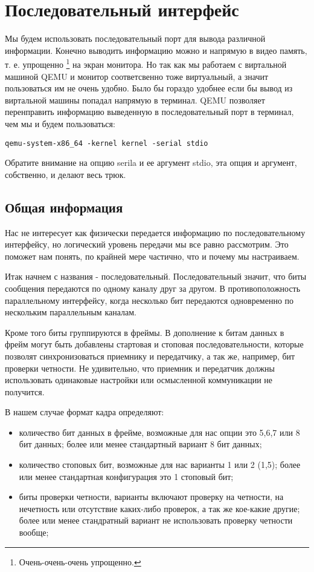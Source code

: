 \section{Последовательный интерфейс}

Мы будем использовать последовательный порт для вывода различной информации.
Конечно выводить информацию можно и напрямую в видео память, т. е. упрощенно
\footnote{Очень-очень-очень упрощенно.} на экран монитора. Но так как мы
работаем с виртальной машиной QEMU и монитор соответсвенно тоже виртуальный, а
значит пользоваться им не очень удобно. Было бы гораздо удобнее если бы вывод
из виртальной машины попадал напрямую в терминал. QEMU позволяет перенправить
информацию выведенную в последовательный порт в терминал, чем мы и будем
пользоваться:

\begin{lstlisting}
qemu-system-x86_64 -kernel kernel -serial stdio
\end{lstlisting}

Обратите внимание на опцию serila и ее аргумент stdio, эта опция и аргумент,
собственно, и делают весь трюк.

\subsection{Общая информация}

Нас не интересует как физически передается информацию по последовательному
интерфейсу, но логический уровень передачи мы все равно рассмотрим. Это поможет
нам понять, по крайней мере частично, что и почему мы настраиваем.

Итак начнем с названия - последовательный. Последовательный значит, что биты
сообщения передаются по одному каналу друг за другом. В противоположность
параллельному интерфейсу, когда несколько бит передаются одновременно по
нескольким параллельным каналам.

Кроме того биты группируются в фреймы. В дополнение к битам данных в фрейм могут
быть добавлены стартовая и стоповая последовательности, которые позволят
синхронизоваться приемнику и передатчику, а так же, например, бит проверки
четности. Не удивительно, что приемник и передатчик должны использовать
одинаковые настройки или осмысленной коммуникации не получится.

В нашем случае формат кадра определяют:
\begin{itemize}
  \item количество бит данных в фрейме, возможные для нас опции это 5,6,7 или 8
  бит данных; более или менее стандартный вариант 8 бит данных;
  \item количество стоповых бит, возможные для нас варианты 1 или 2 (1,5); более
  или менее стандартная конфигурация это 1 стоповый бит;
  \item биты проверки четности, варианты включают проверку на четности, на
  нечетность или отсутствие каких-либо проверок, а так же кое-какие другие;
  более или менее стандратный вариант не использовать проверку четности вообще;
\end{itemize}

